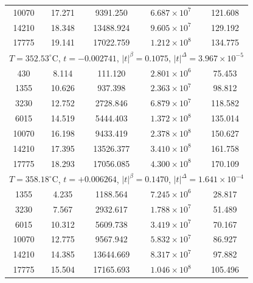 \documentclass[11pt,a4paper]{article}
\begin{document}
\begin{table}[H]
\begin{tabular}{@{}ccccc@{}}
10070
& 17.271
& 9391.250
& $6.687\times10^7$
& 121.608
\\

14210
& 18.348
& 13488.924
& $9.605\times10^7$
& 129.192
\\

17775
& 19.141
& 17022.759
& $1.212\times10^8$
& 134.775
\\

\midrule

\multicolumn{5}{c}{
$T=352.53^\circ\mathrm C$,
$t=-0.002741$,
$|t|^\beta=0.1075$,
$|t|^\Delta=3.967\times10^{-5}$
}
\\

430
& 8.114
& 111.120
& $2.801\times10^6$
& 75.453
\\

1355
& 10.626
& 937.398
& $2.363\times10^7$
& 98.812
\\

3230
& 12.752
& 2728.846
& $6.879\times10^7$
& 118.582
\\

6015
& 14.519
& 5444.403
& $1.372\times10^8$
& 135.014
\\

10070
& 16.198
& 9433.419
& $2.378\times10^8$
& 150.627
\\

14210
& 17.395
& 13526.377
& $3.410\times10^8$
& 161.758
\\

17775
& 18.293
& 17056.085
& $4.300\times10^8$
& 170.109
\\

\midrule

\multicolumn{5}{c}{
$T=358.18^\circ\mathrm C$,
$t=+0.006264$,
$|t|^\beta=0.1470$,
$|t|^\Delta=1.641\times10^{-4}$
}
\\

1355
& 4.235
& 1188.564
& $7.245\times10^6$
& 28.817
\\

3230
& 7.567
& 2932.617
& $1.788\times10^7$
& 51.489
\\

6015
& 10.312
& 5609.738
& $3.419\times10^7$
& 70.167
\\

10070
& 12.775
& 9567.942
& $5.832\times10^7$
& 86.927
\\

14210
& 14.385
& 13644.669
& $8.317\times10^7$
& 97.882
\\

17775
& 15.504
& 17165.693
& $1.046\times10^8$
& 105.496
\\

\bottomrule
\end{tabular}
\end{table}
\end{document}
